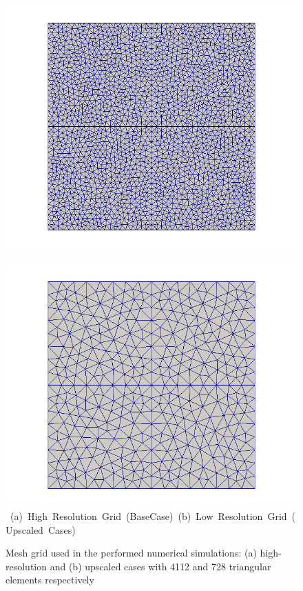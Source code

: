 \begin{figure}[ht] 
\vbox{\vspace{-1cm}
\hbox{\includegraphics[width=.56\textwidth]{./Pics/BaseCase/BaseCase_MeshOnly.png}
      \includegraphics[width=.56\textwidth]{./Pics/ArithMeanCase/ArithMeanCase_MeshOnly.png}}
\vspace{0.cm}
\hbox{\hspace{0.25cm} (a) High Resolution Grid (BaseCase) \hspace{0.75cm} (b) Low Resolution Grid (Upscaled Cases) \hspace{3.0cm}}
\vspace{0.5cm}
}   
\caption{Mesh grid used in the performed numerical simulations: (a) high-resolution and (b) upscaled cases with 4112 and 728 triangular elements respectively}
\label{fig:HiRes_LowRes_Mesh}
\end{figure}
\clearpage


